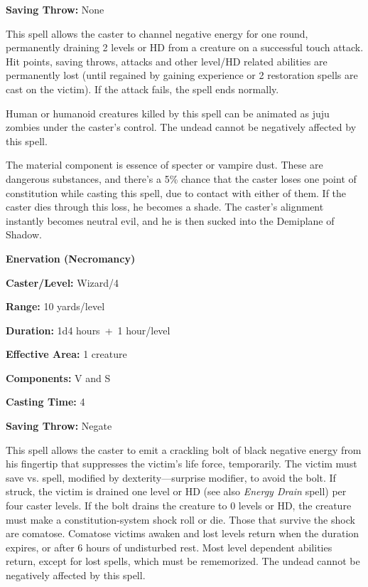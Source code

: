 \begin{multicols}{2}
\begin{minipage}{\columnwidth}
\noindent \textbf{Saving Throw:} None

\end{minipage}

This spell allows the caster to channel negative energy for one round, permanently draining 2 levels or HD from a creature on a successful touch attack.  Hit points, saving throws, attacks and other level/HD related abilities are permanently lost (until regained by gaining experience or 2 restoration spells are cast on the victim).  If the attack fails, the spell ends normally.

Human or humanoid creatures killed by this spell can be animated as juju zombies under the caster's control.  The undead cannot be negatively affected by this spell.  

The material component is essence of specter or vampire dust.  These are dangerous substances, and there's a 5\% chance that the caster loses one point of constitution while casting this spell, due to contact with either of them.  If the caster dies through this loss, he becomes a shade.  The caster's alignment instantly becomes neutral evil, and he is then sucked into the Demiplane of Shadow.  

\vspace{1em}

\noindent
\begin{minipage}{\columnwidth}

\noindent \textbf{Enervation (Necromancy)}

\noindent \textbf{Caster/Level:} Wizard/4

\noindent \textbf{Range:} 10 yards/level

\noindent \textbf{Duration:} 1d4 hours~+~1 hour/level

\noindent \textbf{Effective Area:} 1 creature

\noindent \textbf{Components:} V and S

\noindent \textbf{Casting Time:} 4

\noindent \textbf{Saving Throw:} Negate

\end{minipage}

This spell allows the caster to emit a crackling bolt of black negative energy from his fingertip that suppresses the victim's life force, temporarily.  The victim must save vs. spell, modified by dexterity---surprise modifier, to avoid the bolt.  If struck, the victim is drained one level or HD (see also \textit{Energy Drain} spell) per four caster levels.  If the bolt drains the creature to 0 levels or HD, the creature must make a constitution-system shock roll or die.  Those that survive the shock are comatose.  Comatose victims awaken and lost levels return when the duration expires, or after 6 hours of undisturbed rest.  Most level dependent abilities return, except for lost spells, which must be rememorized.  The undead cannot be negatively affected by this spell. 


\end{multicols}
